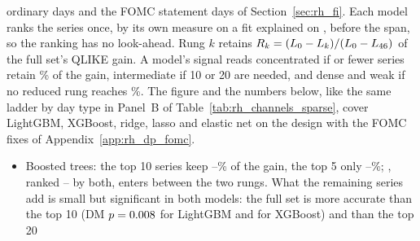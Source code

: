 \begin{itemize}
  \rhldEBNDaysOrd{} ordinary days and the \rhldEBNDaysEv{} FOMC statement days of Section~\ref{sec:rh_fi}. Each model
  ranks the series once, by its own measure on a fit explained on \rhldEBRankYear, before the span, so the ranking
  has no look-ahead. Rung $k$ retains $R_k = (L_0 - L_k)/(L_0 - L_{46})$ of the full set's QLIKE gain. A
  model's signal reads concentrated if \rhldRuleKConc{} or fewer series retain \rhldRulePct\% of the gain,
  intermediate if 10 or 20 are needed, and dense and weak if no reduced rung reaches \rhldRulePct\%.
  The figure and the numbers below, like the same ladder by day type in Panel~B of Table~\ref{tab:rh_channels_sparse},
  cover LightGBM, XGBoost, ridge, lasso and elastic net on the design with the FOMC fixes of
  Appendix~\ref{app:rh_dp_fomc}.
  \begin{itemize}
  \item Boosted trees: the top 10 series keep \rhldEBTreeRTenMin{}--\rhldEBTreeRTenMax{}\% of the gain, the top 5
    only \rhldEBTreeRFiveMin{}--\rhldEBTreeRFiveMax{}\%; \rhfipFomcUntil{}, ranked
    \rhldEBTreeRankFomcUntilMin{}--\rhldEBTreeRankFomcUntilMax{} by both, enters between the two rungs. What the
    remaining series add is small but significant in both models: the full set is more accurate than the top 10 (DM
    $p = 0.008$ for LightGBM and \rhldEBXgbBarPTenFull{} for XGBoost) and than the top 20

\end{itemize}
\end{itemize}
